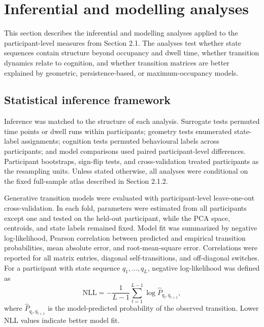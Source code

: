 \documentclass[12pt,a4paper]{report}
\begin{document}


\section{Inferential and modelling analyses}

This section describes the inferential and modelling analyses applied to the participant-level measures from Section 2.1. The analyses test whether state sequences contain structure beyond occupancy and dwell time, whether transition dynamics relate to cognition, and whether transition matrices are better explained by geometric, persistence-based, or maximum-occupancy models.


\subsection{Statistical inference framework}


Inference was matched to the structure of each analysis. Surrogate tests permuted time points or dwell runs within participants; geometry tests enumerated state-label assignments; cognition tests permuted behavioural labels across participants; and model comparisons used paired participant-level differences. Participant bootstraps, sign-flip tests, and cross-validation treated participants as the resampling units. Unless stated otherwise, all analyses were conditional on the fixed full-sample atlas described in Section 2.1.2.

Generative transition models were evaluated with participant-level leave-one-out cross-validation. In each fold, parameters were estimated from all participants except one and tested on the held-out participant, while the PCA space, centroids, and state labels remained fixed. Model fit was summarized by negative log-likelihood, Pearson correlation between predicted and empirical transition probabilities, mean absolute error, and root-mean-square error. Correlations were reported for all matrix entries, diagonal self-transitions, and off-diagonal switches. For a participant with state sequence \(q_1,\ldots,q_L\), negative log-likelihood was defined as
\begin{equation}
\mathrm{NLL}
=
-\frac{1}{L-1}
\sum_{t=1}^{L-1}
\log \hat{P}_{q_t,q_{t+1}},
\end{equation}
where \(\hat{P}_{q_t,q_{t+1}}\) is the model-predicted probability of the observed transition. Lower NLL values indicate better model fit.
\end{document}

